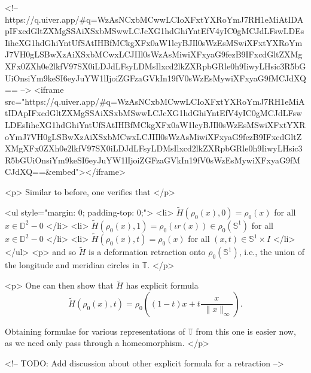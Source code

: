 <!-- https://q.uiver.app/#q=WzAsNCxbMCwwLCIoXFxtYXRoYmJ7RH1eMiAtIDApIFxcdGltZXMgSSAiXSxbMSwwLCJcXG1hdGhiYntEfV4yIC0gMCJdLFswLDEsIihcXG1hdGhiYntUfSAtIHBfMCkgXFx0aW1lcyBJIl0sWzEsMSwiXFxtYXRoYmJ7VH0gLSBwXzAiXSxbMCwxLCJIIl0sWzAsMiwiXFxyaG9fezB9IFxcdGltZXMgXFx0ZXh0e2lkfV97SX0iLDJdLFsyLDMsIlxcd2lkZXRpbGRle0h9IiwyLHsic3R5bGUiOnsiYm9keSI6eyJuYW1lIjoiZGFzaGVkIn19fV0sWzEsMywiXFxyaG9fMCJdXQ== -->
<iframe
src="https://q.uiver.app/#q=WzAsNCxbMCwwLCIoXFxtYXRoYmJ7RH1eMiAtIDApIFxcdGltZXMgSSAiXSxbMSwwLCJcXG1hdGhiYntEfV4yIC0gMCJdLFswLDEsIihcXG1hdGhiYntUfSAtIHBfMCkgXFx0aW1lcyBJIl0sWzEsMSwiXFxtYXRoYmJ7VH0gLSBwXzAiXSxbMCwxLCJIIl0sWzAsMiwiXFxyaG9fezB9IFxcdGltZXMgXFx0ZXh0e2lkfV97SX0iLDJdLFsyLDMsIlxcd2lkZXRpbGRle0h9IiwyLHsic3R5bGUiOnsiYm9keSI6eyJuYW1lIjoiZGFzaGVkIn19fV0sWzEsMywiXFxyaG9fMCJdXQ==&embed"></iframe>

<p>
    Similar to before, one verifies that
</p>

<ul style="margin: 0; padding-top: 0;">
    <li>
        $\widetilde{H}(\rho_{0}(x),0) = \rho_{0}(x)$ for all $x \in \mathbb{D}^{2} - 0$
    </li>
    <li>
        $\widetilde{H}(\rho_{0}(x),1) = \rho_{0}(\iota r(x)) \in \rho_{0}(\mathbb{S}^{1})$ for all $x \in
        \mathbb{D}^{2} - 0$
    </li>
    <li>
        $\widetilde{H}(\rho_{0}(x),t) = \rho_{0}(x)$ for all $(x,t) \in \mathbb{S}^{1} \times I$
    </li>
</ul>
<p>
    and so $\widetilde{H}$ is a deformation retraction onto $\rho_{0}(\mathbb{S}^{1})$, i.e., the union of
    the longitude and meridian circles in $\mathbb{T}$.
</p>

<p>
    One can then show that $\widetilde{H}$ has explicit formula
    $$\widetilde{H}(\rho_{0}(x), t) = \rho_{0} \left((1-t)x + t\frac{x}{\,\,\lVert x
    \rVert_{\infty}}\right).$$

    Obtaining formulae for various representations of $\mathbb{T}$ from this one is easier now,
    as we need only pass through a homeomorphism.
</p>

<!-- TODO: Add discussion about other explicit formula for a retraction -->